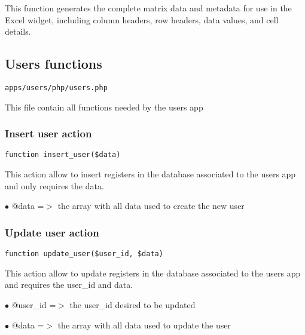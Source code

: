 \documentclass[a4paper]{article}
\begin{document}
This function generates the complete matrix data and metadata for use in
the Excel widget, including column headers, row headers, data values, and cell details.

\hypertarget{toc181}{}
\subsection{Users functions}

\begin{lstlisting}
apps/users/php/users.php
\end{lstlisting}

This file contain all functions needed by the users app

\hypertarget{toc182}{}
\subsubsection{Insert user action}

\begin{lstlisting}
function insert_user($data)
\end{lstlisting}

This action allow to insert registers in the database associated to
the users app and only requires the data.

\begin{compactitem}
\item[\color{myblue}$\bullet$] @data =$>$ the array with all data used to create the new user
\end{compactitem}

\hypertarget{toc183}{}
\subsubsection{Update user action}

\begin{lstlisting}
function update_user($user_id, $data)
\end{lstlisting}

This action allow to update registers in the database associated to
the users app and requires the user\_id and data.

\begin{compactitem}
\item[\color{myblue}$\bullet$] @user\_id =$>$ the user\_id desired to be updated
\item[\color{myblue}$\bullet$] @data    =$>$ the array with all data used to update the user
\end{compactitem}
\end{document}
